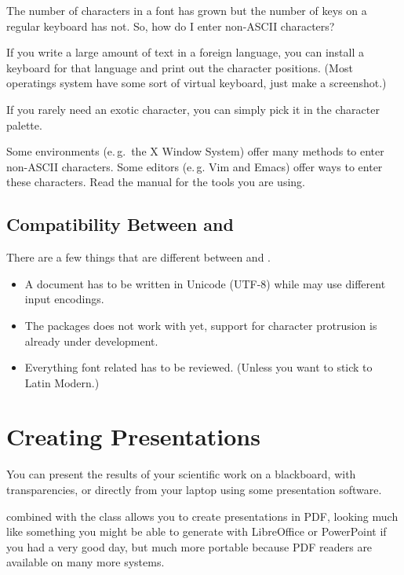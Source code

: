 The number of characters in a font has grown but the number of keys on a
regular keyboard has not. So, how do I enter non-ASCII characters?

If you write a large amount of text in a foreign language, you can install a
keyboard for that language and print out the character positions. (Most
operatings system have some sort of virtual keyboard, just make a
screenshot.)

If you rarely need an exotic character, you can simply pick it in the
character palette.

Some environments (e.\,g.\ the X Window System) offer many methods to enter
non-ASCII characters. Some editors (e.\,g. Vim and Emacs) offer ways to
enter these characters. Read the manual for the tools you are using.

\subsection{Compatibility Between  and }

There are a few things that are different between  and .

\begin{itemize}
	\item A  document has to be written in
	Unicode (UTF-8) while  may use different input encodings.
\item The  packages does not work with  yet,
	support for character protrusion is already under development.
\item Everything font related has to be reviewed. (Unless you want to stick
	to Latin Modern.)
\end{itemize}

\section{Creating Presentations}%
\label{sec:beamer}
You can present the results of your scientific work on a blackboard,
with transparencies, or directly from your laptop using some
presentation software.

 combined with the  class allows you to
create presentations in PDF, looking much like something you might be
able to generate with LibreOffice or PowerPoint if you had a very good day, but much
more portable because PDF readers are available on many more
systems.

